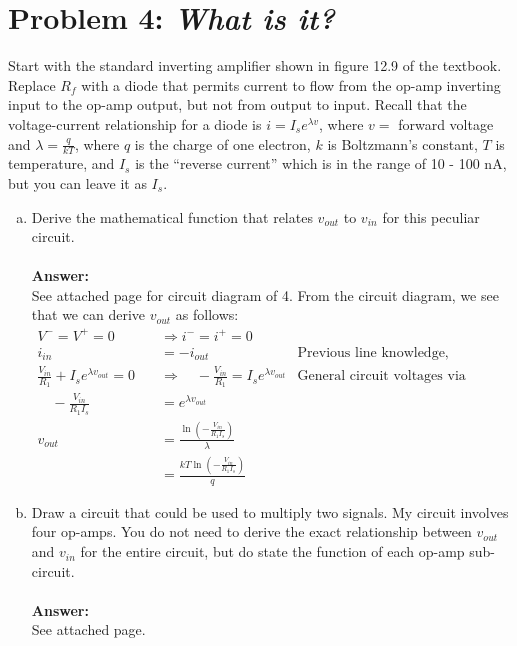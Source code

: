 \documentclass[12pt, a4paper]{article}
\begin{document}
\section*{Problem 4: \textit{What is it?}}
Start with the standard inverting amplifier shown in figure 12.9 of the textbook. Replace $R_f$ with a diode that permits current to flow from the op-amp inverting input to the op-amp
output, but not from output to input. Recall that the voltage-current relationship for a
diode is $i = I_s e^{\lambda v}$, where $v= $ forward voltage and $\lambda = \frac{q}{kT}$, where $q$ is the charge of one electron, $k$ is Boltzmann's constant, $T$ is temperature, and $I_s$ is the ``reverse current'' which
is in the range of 10 - 100 nA, but you can leave it as $I_s$.
\begin{enumerate}[(a)]
\item Derive the mathematical function that relates $v_{out}$ to $v_{in}$ for this peculiar circuit. \\ \\
\textbf{Answer: } \\
See attached page for circuit diagram of 4. From the circuit diagram, we see that we can derive $v_{out}$ as follows:
\begin{align*}
V^{-} = V^{+} = 0 &\Rightarrow i^{-} = i^{+} = 0 \\
i_{in} &= - i_{out} &\text{Previous line knowledge, Kirchhoff's Rule}\\
\frac{V_{in}}{R_1} + I_s e^{\lambda v_{out}} = 0 \quad &\Rightarrow \quad -\frac{V_{in}}{R_1} = I_s e^{\lambda v_{out}}  &\text{General circuit voltages via Ohm's Law} \\
 \quad -\frac{V_{in}}{R_1 I_s} &= e^{\lambda v_{out}} \\
v_{out} &= \frac{\ln(-\frac{V_{in}}{R_1 I_s})}{\lambda} \\
&=  \frac{kT \ln(-\frac{V_{in}}{R_1 I_s})}{q}
\end{align*}
\item Draw a circuit that could be used to multiply two signals. My circuit involves four op-amps.
You do not need to derive the exact relationship between $v_{out}$ and $v_{in}$ for the
entire circuit, but do state the function of each op-amp sub-circuit. \\ \\
\textbf{Answer: } \\
See attached page.
\end{enumerate}
\end{document}
